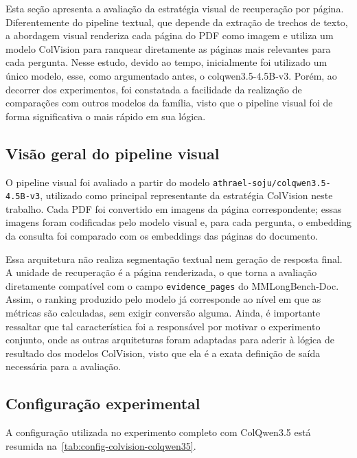 Esta seção apresenta a avaliação da estratégia visual de recuperação por página. Diferentemente do pipeline textual, que depende da extração de trechos de texto, a abordagem visual renderiza cada página do PDF como imagem e utiliza um modelo ColVision para ranquear diretamente as páginas mais relevantes para cada pergunta. Nesse estudo, devido ao tempo, inicialmente foi utilizado um único modelo, esse, como argumentado antes, o colqwen3.5-4.5B-v3. Porém, ao decorrer dos experimentos, foi constatada a facilidade da realização de comparações com outros modelos da família, visto que o pipeline visual foi de forma significativa o mais rápido em sua lógica.

\subsection{Visão geral do pipeline visual}
\label{subsec:colvision-visao-geral}

O pipeline visual foi avaliado a partir do modelo \texttt{athrael-soju/colqwen3.5-4.5B-v3}\cite{FAYSSE2025COLPALI}, utilizado como principal representante da estratégia ColVision neste trabalho. Cada PDF foi convertido em imagens da página correspondente; essas imagens foram codificadas pelo modelo visual e, para cada pergunta, o embedding da consulta foi comparado com os embeddings das páginas do documento.

Essa arquitetura não realiza segmentação textual nem geração de resposta final. A unidade de recuperação é a página renderizada, o que torna a avaliação diretamente compatível com o campo \texttt{evidence\_pages} do MMLongBench-Doc. Assim, o ranking produzido pelo modelo já corresponde ao nível em que as métricas são calculadas, sem exigir conversão alguma. Ainda, é importante ressaltar que tal característica foi a responsável por motivar o experimento conjunto, onde as outras arquiteturas foram adaptadas para aderir à lógica de resultado dos modelos ColVision, visto que ela é a exata definição de saída necessária para a avaliação.

\subsection{Configuração experimental}
\label{subsec:colvision-configuracao}

A configuração utilizada no experimento completo com ColQwen3.5 está resumida na~\ref{tab:config-colvision-colqwen35}.

